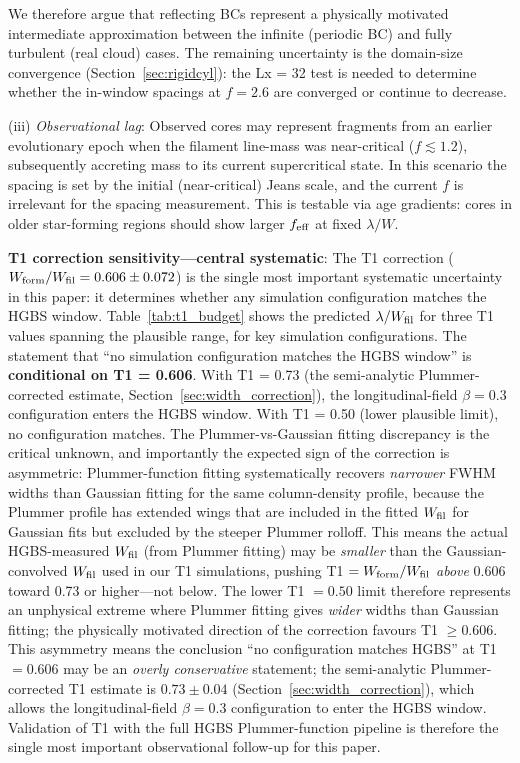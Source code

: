 \documentclass[twoside,twocolumn]{mnras}
\begin{document}
We therefore argue that reflecting BCs represent a physically motivated intermediate
approximation between the infinite (periodic BC) and fully turbulent (real cloud) cases.
The remaining uncertainty is the domain-size convergence (Section~\ref{sec:rigidcyl}):
the Lx = 32 test is needed to determine whether the in-window spacings at $f = 2.6$
are converged or continue to decrease.

(iii) \textit{Observational lag}: Observed cores may represent fragments from an earlier evolutionary epoch when the filament line-mass was near-critical ($f \lesssim 1.2$), subsequently accreting mass to its current supercritical state. In this scenario the spacing is set by the initial (near-critical) Jeans scale, and the current $f$ is irrelevant for the spacing measurement. This is testable via age gradients: cores in older star-forming regions should show larger $f_{\rm eff}$ at fixed $\lambda/W$.

\textbf{T1 correction sensitivity---central systematic}: The T1 correction
($W_{\rm form}/W_{\rm fil} = 0.606 \pm 0.072$) is the single most important systematic
uncertainty in this paper: it determines whether any simulation configuration matches
the HGBS window. Table~\ref{tab:t1_budget} shows the predicted $\lambda/W_{\rm fil}$
for three T1 values spanning the plausible range, for key simulation configurations.
The statement that ``no simulation configuration matches the HGBS window'' is
\textbf{conditional on T1 = 0.606}. With T1 = 0.73 (the semi-analytic Plummer-corrected estimate, Section~\ref{sec:width_correction}), the longitudinal-field $\beta = 0.3$ configuration enters the HGBS window.
With T1 = 0.50 (lower plausible limit), no configuration matches. The Plummer-vs-Gaussian fitting discrepancy is the critical unknown, and importantly the expected sign of the correction is asymmetric: Plummer-function fitting systematically recovers \textit{narrower} FWHM widths than Gaussian fitting for the same column-density profile, because the Plummer profile has extended wings that are included in the fitted $W_{\rm fil}$ for Gaussian fits but excluded by the steeper Plummer rolloff. This means the actual HGBS-measured $W_{\rm fil}$ (from Plummer fitting) may be \textit{smaller} than the Gaussian-convolved $W_{\rm fil}$ used in our T1 simulations, pushing T1 $= W_{\rm form}/W_{\rm fil}$ \textit{above} 0.606 toward 0.73 or higher---not below. The lower T1 $= 0.50$ limit therefore represents an unphysical extreme where Plummer fitting gives \textit{wider} widths than Gaussian fitting; the physically motivated direction of the correction favours T1 $\geq 0.606$. This asymmetry means the conclusion ``no configuration matches HGBS'' at T1 $= 0.606$ may be an \textit{overly conservative} statement; the semi-analytic Plummer-corrected T1 estimate is $0.73 \pm 0.04$ (Section~\ref{sec:width_correction}), which allows the longitudinal-field $\beta = 0.3$ configuration to enter the HGBS window. Validation of T1 with the full HGBS Plummer-function pipeline is therefore the single most important observational follow-up for this paper.
\end{document}
